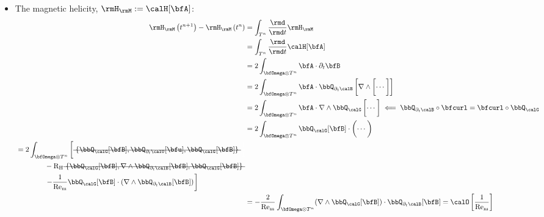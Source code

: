 \begin{itemize}
        \item  The magnetic helicity, $\rmH_{\rmM}  :=  \calH[\bfA]$:
        \begin{align}
                \rmH_{\rmM}\left(t^{n + 1}\right) - \rmH_{\rmM}\left(t^{n}\right)
                &=  \int_{T^{n}}\frac{\rmd}{\rmd t}\rmH_{\rmM}  \\
                &=  \int_{T^{n}}\frac{\rmd}{\rmd t}\calH[\bfA]  \\
                &=  2\int_{\bfOmega\otimes T^{n}}\bfA\cdot\partial_{t}\bfB  \\
                &=  2\int_{\bfOmega\otimes T^{n}}\bfA\cdot\bbQ_{\partial_{t}\calB}\left[\nabla\wedge\left[\cdots\tall\right]\right]  \\
                &=  2\int_{\bfOmega\otimes T^{n}}\bfA\cdot\nabla\wedge\bbQ_{\calG}\left[\cdots\tall\right]  \impliedby  \bbQ_{\partial_{t}\calB}\circ\bfcurl = \bfcurl\circ\bbQ_{\calG}  \\
                &=  2\int_{\bfOmega\otimes T^{n}}\bbQ_{\calG}[\bfB]\cdot\left(\cdots\tall\right)  \\
            \begin{split}
                &=  2\int_{\bfOmega\otimes T^{n}}\left[\mst{\{\bbQ_{\calG}[\bfB], \bbQ_{\partial_{t}\calU}[\bfu], \bbQ_{\calG}[\bfB]\}}\tall\right.  \\
                &\qquad\qquad- \rmRH\mst{\{\bbQ_{\calG}[\bfB], \nabla\wedge\bbQ_{\partial_{t}\calB}[\bfB], \bbQ_{\calG}[\bfB]\}}  \\
                &\qquad\qquad\left.- \frac{1}{\rmRem}\bbQ_{\calG}[\bfB]\cdot(\nabla\wedge\bbQ_{\partial_{t}\calB}[\bfB])\tall\right]
            \end{split}  \\
                &=  - \frac{2}{\rmRem}\int_{\bfOmega\otimes T^{n}}(\nabla\wedge\bbQ_{\calG}[\bfB])\cdot\bbQ_{\partial_{t}\calB}[\bfB]  =  \calO\left[\frac{1}{\rmRem}\right]
        \end{align}
    \end{itemize}
    
    \shortline

